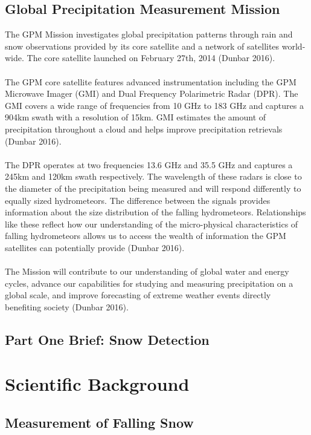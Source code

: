 \documentclass[10pt,a4paper]{article}
\begin{document}
\subsection{Global Precipitation Measurement Mission}
The GPM Mission investigates global precipitation patterns through rain and snow observations provided by its core satellite and a network of satellites world-wide. The core satellite launched on February 27th, 2014 (Dunbar 2016). 
\\\\
The GPM core satellite features advanced instrumentation including the GPM Microwave Imager (GMI) and Dual Frequency Polarimetric Radar (DPR). The GMI covers a wide range of frequencies from 10 GHz to 183 GHz and captures a 904km swath with a resolution of 15km. GMI estimates the amount of precipitation throughout a cloud and helps improve precipitation retrievals (Dunbar 2016). 
\\\\
The DPR operates at two frequencies 13.6 GHz and 35.5 GHz and captures a 245km and 120km swath respectively. The wavelength of these radars is close to the diameter of the precipitation being measured and will respond differently to equally sized hydrometeors. The difference between the signals provides information about the size distribution of the falling hydrometeors. Relationships like these reflect how our understanding of the micro-physical characteristics of falling hydrometeors allows us to access the wealth of information the GPM satellites can potentially provide (Dunbar 2016). 
\\\\
The Mission will contribute to our understanding of global water and energy cycles, advance our capabilities for studying and measuring precipitation on a global scale, and improve forecasting of extreme weather events directly benefiting society (Dunbar 2016).

\subsection{Part One Brief: Snow Detection}

\section{Scientific Background}
\subsection{Measurement of Falling Snow}
\end{document}
